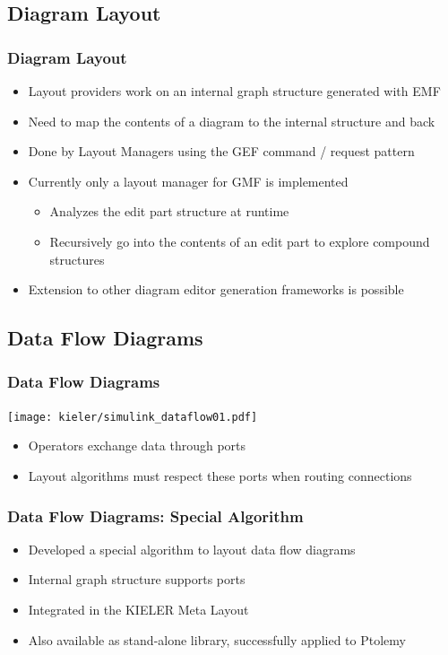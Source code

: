 \subsection{Diagram Layout}
\begin{frame}
  \frametitle{Diagram Layout}
  \begin{itemize}
    \item<1-> Layout providers work on an internal graph structure generated
      with EMF
    \item<2-> Need to map the contents of a diagram to the internal structure
      and back
    \item<3-> Done by \alert{Layout Managers} using the GEF command / request
      pattern
    \item<4-> Currently only a layout manager for GMF is implemented
      \begin{itemize}
        \item Analyzes the edit part structure at runtime
        \item Recursively go into the contents of an edit part to explore
          compound structures
      \end{itemize}
    \item<5-> Extension to other diagram editor generation frameworks is
      possible
  \end{itemize}
\end{frame}

\subsection{Data Flow Diagrams}
\begin{frame}
  \frametitle{Data Flow Diagrams}
  \begin{center}
    \texttt{[image: kieler/simulink\_dataflow01.pdf]}
  \end{center}
  \begin{itemize}
    \item<1-> Operators exchange data through \alert{ports}
    \item<2-> Layout algorithms must respect these ports when routing connections
  \end{itemize}
\end{frame}

\begin{frame}
  \frametitle{Data Flow Diagrams: Special Algorithm}
  \begin{itemize}
    \item<1-> Developed a special algorithm to layout data flow diagrams
    \item<2-> Internal graph structure supports ports
    \item<3-> Integrated in the KIELER Meta Layout
    \item<4-> Also available as stand-alone library, successfully applied to
      \alert{Ptolemy}
  \end{itemize}
\end{frame}

